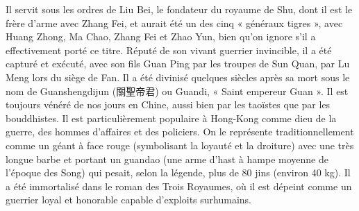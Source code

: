 \begin{Ex}[Guan Yu ]
Il servit sous les ordres de Liu Bei, le fondateur du royaume de Shu, dont il est le frère d'arme avec Zhang Fei, et aurait été un des cinq « généraux tigres », avec Huang Zhong, Ma Chao, Zhang Fei et Zhao Yun, bien qu’on ignore s’il a effectivement porté ce titre. Réputé de son vivant guerrier invincible, il a été capturé et exécuté, avec son fils Guan Ping par les troupes de Sun Quan, par Lu Meng lors du siège de Fan. Il a été divinisé quelques siècles après sa mort sous le nom de Guanshengdijun (關聖帝君) ou Guandi, « Saint empereur Guan ». Il est toujours vénéré de nos jours en Chine, aussi bien par les taoïstes que par les bouddhistes. Il est particulièrement populaire à Hong-Kong comme dieu de la guerre, des hommes d’affaires et des policiers. On le représente traditionnellement comme un géant à face rouge (symbolisant la loyauté et la droiture) avec une très longue barbe et portant un guandao (une arme d’hast à hampe moyenne de l’époque des Song) qui pesait, selon la légende, plus de 80 jins (environ 40 kg). Il a été immortalisé dans le roman des Trois Royaumes, où il est dépeint comme un guerrier loyal et honorable capable d'exploits surhumains.
\end{Ex}

